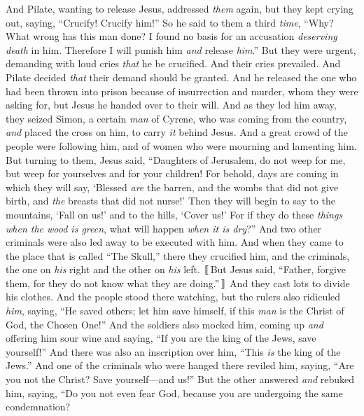 \begin{biblechapter}
\verse And Pilate, wanting to release Jesus, addressed \textit{them}﻿ again,
\verse but they kept crying out, saying, “Crucify! Crucify him!”
\verse So he said to them a third \textit{time}, “Why? What wrong has this man done? I found no basis for an accusation \textit{deserving death} in him. Therefore I will punish him \textit{and} release \textit{him}.”
\verse But they were urgent, demanding with loud cries \textit{that} he be crucified. And their cries prevailed.
\verse And Pilate decided \textit{that} their demand should be granted.
\verse And he released the one who had been thrown into prison because of insurrection and murder, whom they were asking for, but Jesus he handed over to their will.
 And as they led him away, they seized Simon, a certain \textit{man} of Cyrene, who was coming from the country, \textit{and} placed the cross on him, to carry \textit{it} behind Jesus.
\verse And a great crowd of the people were following him, and of women who were mourning and lamenting him.
\verse But turning to them, Jesus said, “Daughters of Jerusalem, do not weep for me, but weep for yourselves and for your children!
\verse For behold, days are coming in which they will say, ‘Blessed \textit{are} the barren, and the wombs that did not give birth, and \textit{the} breasts that did not nurse!’
\verse Then they will begin to say to the mountains, ‘Fall on us!’ and to the hills, ‘Cover us!’
\verse For if they do these \textit{things} \textit{when the wood is green}, what will happen \textit{when it is dry}?”
\verse And two other criminals were also led away to be executed with him.
\verse And when they came to the place that is called “The Skull,” there they crucified him, and the criminals, the one on \textit{his} right and the other on \textit{his} left.
\verse 〚But Jesus said, “Father, forgive them, for they do not know what they are doing.”〛 And they cast lots to divide his clothes.
\verse And the people stood there watching, but the rulers also ridiculed \textit{him}, saying, “He saved others; let him save himself, if this \textit{man} is the Christ of God, the Chosen One!”
\verse And the soldiers also mocked him, coming up \textit{and} offering him sour wine
\verse and saying, “If you are the king of the Jews, save yourself!”
\verse And there was also an inscription over him, “This \textit{is} the king of the Jews.”
\verse And one of the criminals who were hanged there reviled him, saying, “Are you not the Christ? Save yourself—and us!”
\verse But the other answered \textit{and} rebuked him, saying, “Do you not even fear God, because you are undergoing the same condemnation?

\end{biblechapter}
